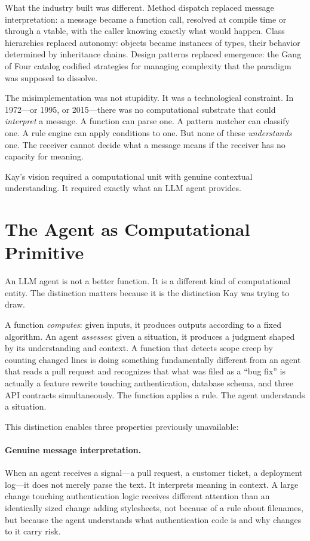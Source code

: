 \documentclass[11pt,twocolumn]{article}
\begin{document}
What the industry built was different.  Method dispatch replaced message
interpretation: a message became a function call, resolved at compile
time or through a vtable, with the caller knowing exactly what would
happen.  Class hierarchies replaced autonomy: objects became instances
of types, their behavior determined by inheritance chains.  Design
patterns replaced emergence: the Gang of Four catalog
\citep{gamma1994design} codified strategies for managing complexity that
the paradigm was supposed to dissolve.

The misimplementation was not stupidity.  It was a technological
constraint.  In 1972---or 1995, or 2015---there was no computational
substrate that could \emph{interpret} a message.  A function can parse
one.  A pattern matcher can classify one.  A rule engine can apply
conditions to one.  But none of these \emph{understands} one.  The
receiver cannot decide what a message means if the receiver has no
capacity for meaning.

Kay's vision required a computational unit with genuine contextual
understanding.  It required exactly what an LLM agent provides.

\section{The Agent as Computational Primitive}
\label{sec:agent}

An LLM agent is not a better function.  It is a different kind of
computational entity.  The distinction matters because it is the
distinction Kay was trying to draw.

A function \emph{computes}: given inputs, it produces outputs according
to a fixed algorithm.  An agent \emph{assesses}: given a situation, it
produces a judgment shaped by its understanding and context.  A function
that detects scope creep by counting changed lines is doing something
fundamentally different from an agent that reads a pull request and
recognizes that what was filed as a ``bug fix'' is actually a feature
rewrite touching authentication, database schema, and three API
contracts simultaneously.  The function applies a rule.  The agent
understands a situation.

This distinction enables three properties previously unavailable:

\paragraph{Genuine message interpretation.}  When an agent receives a
signal---a pull request, a customer ticket, a deployment log---it does
not merely parse the text.  It interprets meaning in context.  A
large change touching authentication logic receives different attention
than an identically sized change adding stylesheets, not because of a
rule about filenames, but because the agent understands what
authentication code is and why changes to it carry risk.
\end{document}
